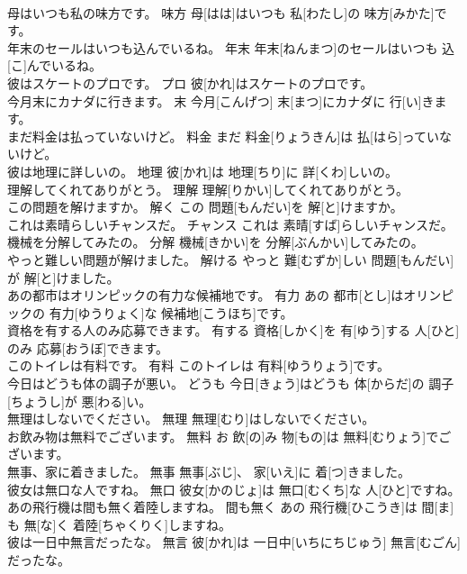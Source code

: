 \documentclass[8pt]{extreport}
\begin{document}
\begin{CJK}{UTF8}{min}
\\	母はいつも私の味方です。	味方	母[はは]はいつも 私[わたし]の 味方[みかた]です。	
\\	年末のセールはいつも込んでいるね。	年末	年末[ねんまつ]のセールはいつも 込[こ]んでいるね。	
\\	彼はスケートのプロです。	プロ	彼[かれ]はスケートのプロです。	
\\	今月末にカナダに行きます。	末	今月[こんげつ] 末[まつ]にカナダに 行[い]きます。	
\\	まだ料金は払っていないけど。	料金	まだ 料金[りょうきん]は 払[はら]っていないけど。	
\\	彼は地理に詳しいの。	地理	彼[かれ]は 地理[ちり]に 詳[くわ]しいの。	
\\	理解してくれてありがとう。	理解	理解[りかい]してくれてありがとう。	
\\	この問題を解けますか。	解く	この 問題[もんだい]を 解[と]けますか。	
\\	これは素晴らしいチャンスだ。	チャンス	これは 素晴[すば]らしいチャンスだ。	
\\	機械を分解してみたの。	分解	機械[きかい]を 分解[ぶんかい]してみたの。	
\\	やっと難しい問題が解けました。	解ける	やっと 難[むずか]しい 問題[もんだい]が 解[と]けました。	
\\	あの都市はオリンピックの有力な候補地です。	有力	あの 都市[とし]はオリンピックの 有力[ゆうりょく]な 候補地[こうほち]です。	
\\	資格を有する人のみ応募できます。	有する	資格[しかく]を 有[ゆう]する 人[ひと]のみ 応募[おうぼ]できます。	
\\	このトイレは有料です。	有料	このトイレは 有料[ゆうりょう]です。	
\\	今日はどうも体の調子が悪い。	どうも	今日[きょう]はどうも 体[からだ]の 調子[ちょうし]が 悪[わる]い。	
\\	無理はしないでください。	無理	無理[むり]はしないでください。	
\\	お飲み物は無料でございます。	無料	お 飲[の]み 物[もの]は 無料[むりょう]でございます。	
\\	無事、家に着きました。	無事	無事[ぶじ]、 家[いえ]に 着[つ]きました。	
\\	彼女は無口な人ですね。	無口	彼女[かのじょ]は 無口[むくち]な 人[ひと]ですね。	
\\	あの飛行機は間も無く着陸しますね。	間も無く	あの 飛行機[ひこうき]は 間[ま]も 無[な]く 着陸[ちゃくりく]しますね。	
\\	彼は一日中無言だったな。	無言	彼[かれ]は 一日中[いちにちじゅう] 無言[むごん]だったな。	

\end{CJK}
\end{document}
